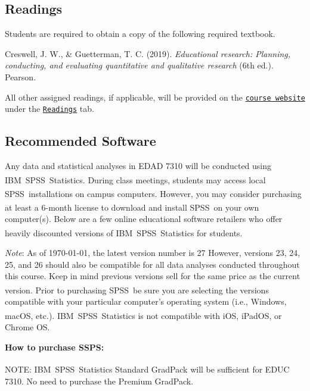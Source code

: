 \documentclass[
]{article}
\begin{document}
\subsection{Readings}

Students are required to obtain a copy of the following required
textbook.

\begin{hangparas}{.4in}{1}
Creswell, J. W., \& Guetterman, T. C. (2019). {\em{Educational research: Planning, conducting, and evaluating quantitative and qualitative research}} (6th ed.). Pearson.
\end{hangparas}

All other assigned readings, if applicable, will be provided on the
\texttt{\href{https://mycourses.umhb.edu/courses/23592}{course website}}
under the
\texttt{\href{https://mycourses.umhb.edu/courses/23592/files/folder/Readings}{Readings}}
tab.

\subsection{Recommended Software}

Any data and statistical analyses in EDAD 7310 will be conducted using
IBM\textsuperscript{\textregistered}~SPSS\textsuperscript{\textregistered}~Statistics.
During class meetings, students may access local
SPSS\textsuperscript{\textregistered}~installations on campus computers.
However, you may consider purchasing at least a 6-month license to
download and install SPSS\textsuperscript{\textregistered}~on your own
computer(s). Below are a few online educational software retailers who
offer heavily discounted versions of
IBM\textsuperscript{\textregistered}~SPSS\textsuperscript{\textregistered}~Statistics
for students.

\emph{Note}: As of \today, the latest version number is 27 However,
versions 23, 24, 25, and 26 should also be compatible for all data
analyses conducted throughout this course. Keep in mind previous
versions sell for the same price as the current version. Prior to
purchasing SPSS\textsuperscript{\textregistered}~be sure you are
selecting the versions compatible with your particular computer's
operating system (i.e., Windows, macOS, etc.).
IBM\textsuperscript{\textregistered}~SPSS\textsuperscript{\textregistered}~Statistics
is not compatible with iOS, iPadOS, or Chrome OS.

\textbf{How to purchase SSPS:}

\begin{tcolorbox}
[width=\linewidth, sharp corners=all, colback=white!95!red]
NOTE: IBM\textsuperscript{\textregistered}\ SPSS\textsuperscript{\textregistered}\ Statistics Standard GradPack will be sufficient for EDUC 7310. No need to purchase the Premium GradPack.
\end{tcolorbox}
\end{document}
